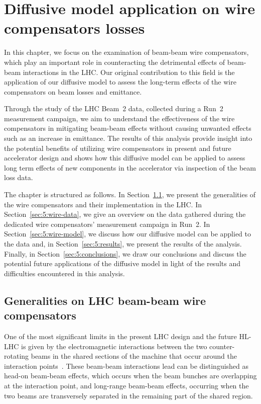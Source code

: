 \chapter{Diffusive model application on wire compensators losses}\label{ch:wire-compensators}

In this chapter, we focus on the examination of beam-beam wire compensators, which play an important role in counteracting the detrimental effects of beam-beam interactions in the LHC. Our original contribution to this field is the application of our diffusive model to assess the long-term effects of the wire compensators on beam losses and emittance.

Through the study of the LHC Beam~2 data, collected during a Run~2 measurement campaign, we aim to understand the effectiveness of the wire compensators in mitigating beam-beam effects without causing unwanted effects such as an increase in emittance. The results of this analysis provide insight into the potential benefits of utilizing wire compensators in present and future accelerator design and shows how this diffusive model can be applied to assess long term effects of new components in the accelerator via inspection of the beam loss data.

The chapter is structured as follows. In Section~\ref{sec:5:wire-compensators}, we present the generalities of the wire compensators and their implementation in the LHC. In Section~\ref{sec:5:wire-data}, we give an overview on the data gathered during the dedicated wire compensators' measurement campaign in Run~2. In Section~\ref{sec:5:wire-model}, we discuss how our diffusive model can be applied to the data and, in Section~\ref{sec:5:results}, we present the results of the analysis. Finally, in Section~\ref{sec:5:conclusions}, we draw our conclusions and discuss the potential future applications of the diffusive model in light of the results and difficulties encountered in this analysis.

\section{Generalities on LHC beam-beam wire compensators}\label{sec:5:wire-compensators}

One of the most significant limits in the present LHC design and the future HL-LHC is given by the electromagnetic interactions between the two counter-rotating beams in the shared sections of the machine that occur around the interaction points~\cite{Arduini_2016}. These beam-beam interactions lead can be distinguished as head-on beam-beam effects, which occurs when the beam bunches are overlapping at the interaction point, and long-range beam-beam effects, occurring when the two beams are transversely separated in the remaining part of the shared region.

